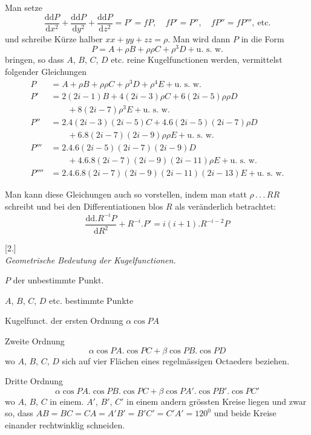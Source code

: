 Man setze
\[
\frac{\mathrm d\mathrm dP}{\mathrm dx^2}+\frac{\mathrm d\mathrm dP}{\mathrm dy^2}+\frac{\mathrm d\mathrm dP}{\mathrm dz^2}=P'=fP,\quad fP'=P'',\quad fP''=fP''',\ \text{etc.}
\]
und schreibe Kürze halber $xx+yy+zz=\rho$. Man wird dann $P$ in die Form
\[
P=A+\rho B+\rho\rho C+\rho^3D+\text{u. s. w.}
\]
bringen, so dass $A$, $B$, $C$, $D$ etc. reine Kugelfunctionen werden, vermittelst folgender Gleichungen
\[
\begin{aligned}
P&=A+\rho B+\rho\rho C+\rho^3D+\rho^4E+\text{u. s. w.}\\
P'&=2(2i-1)B+4(2i-3)\rho C+6(2i-5)\rho\rho D\\
&\qquad+8(2i-7)\rho^3E+\text{u. s. w.}\\
P''&=2.4(2i-3)(2i-5)C+4.6(2i-5)(2i-7)\rho D\\
&\qquad+6.8(2i-7)(2i-9)\rho\rho E+\text{u. s. w.}\\
P'''&=2.4.6(2i-5)(2i-7)(2i-9)D\\
&\qquad+4.6.8(2i-7)(2i-9)(2i-11)\rho E+\text{u. s. w.}\\
P''''&=2.4.6.8(2i-7)(2i-9)(2i-11)(2i-13)E+\text{u. s. w.}
\end{aligned}
\]

Man kann diese Gleichungen auch so vorstellen, indem man statt $\rho\, .\, .\, .\,RR$ schreibt und bei den Differentiationen blos $R$ als veränderlich betrachtet:
\[
\frac{\mathrm d\mathrm d.R^{-i}P}{\mathrm dR^2}+R^{-i}.P'=i(i+1).R^{-i-2}P
\]

\begin{center}[2.]\\\textit{Geometrische Bedeutung der Kugelfunctionen.}\end{center}
$P$ der unbestimmte Punkt.

$A$, $B$, $C$, $D$ etc. bestimmte Punkte

Kugelfunct. der ersten Ordnung $\alpha\cos PA$

Zweite Ordnung
\[
\alpha\cos PA.\cos PC+\beta\cos PB.\cos PD
\]
wo $A$, $B$, $C$, $D$ sich auf vier Flächen eines regelmässigen Octaeders beziehen.
\begin{center}\resizebox{.36\linewidth}{!}{}\end{center}
Dritte Ordnung
\[
\alpha\cos PA.\cos PB.\cos PC+\beta\cos PA'.\cos PB'.\cos PC'
\]
wo $A$, $B$, $C$ in einem. $A'$, $B'$, $C'$ in einem andern grössten Kreise liegen und zwar so, dass $AB=BC=CA=A'B'=B'C'=C'A'=120^0$ und beide Kreise einander rechtwinklig schneiden.

